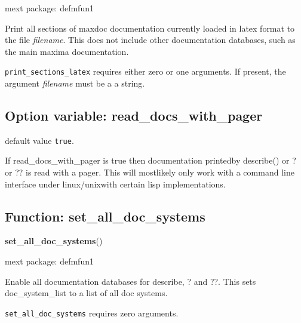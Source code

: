 \documentclass[]{article}
\begin{document}
\noindent mext package: defmfun1



\vspace{5 pt}
Print all sections of maxdoc documentation currently loaded in latex format to the file {\it filename}. This does not include other documentation databases, such as the main maxima documentation. 

\vspace{5 pt}

   {\tt print\_sections\_latex} requires either zero or one arguments. If present, the argument {\it filename} must be a a string.


\vspace{5 pt}


\subsection{Option variable: read\_docs\_with\_pager\label{sec:read_docs_with_pager}}
\hypertarget{read_docs_with_pager}{}



\vspace{5 pt}
  default value \verb#true#.

If read\_docs\_with\_pager is true then documentation printedby describe() or ? or ?? is read with a pager. This will mostlikely only work with a command line interface under linux/unixwith certain lisp implementations. 

\vspace{5 pt}


\subsection{Function: set\_all\_doc\_systems\label{sec:set_all_doc_systems}}
\hypertarget{set_all_doc_systems}{}
{\bf set\_all\_doc\_systems}()


\noindent mext package: defmfun1



\vspace{5 pt}
Enable all documentation databases for describe, ? and ??. This sets doc\_system\_list to a list of all doc systems. 

\vspace{5 pt}

   {\tt set\_all\_doc\_systems} requires zero arguments.
\end{document}
